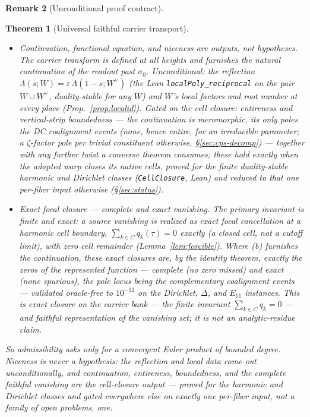 \documentclass[11pt]{article}
\newtheorem{theorem}{Theorem}
\theoremstyle{definition}
\newtheorem{remark}[theorem]{Remark}
\renewcommand{\Re}{\operatorname{Re}}
\begin{document}
\begin{remark}[Unconditional proof contract]
\begin{enumerate}
\begin{theorem}[Universal faithful carrier transport]
\begin{itemize}
$\{\Re s>\sigma_0\}$; the growth/magnitude clock carries the coefficients $a_n(W)$ whatever their size, so no
Ramanujan bound is needed.
\item[\textup{(b)}] \emph{Continuation, functional equation, and niceness are outputs, not hypotheses.} The
carrier transform is defined at all heights and furnishes the natural continuation of the readout past
$\sigma_0$. \emph{Unconditional}: the reflection $\Lambda(s;W)=\varepsilon\,\Lambda(1-s;W^\vee)$ (the Lean
\texttt{localPoly\_reciprocal} on the pair $W\sqcup W^\vee$, duality-stable for any $W$) and $W$'s local factors
and root number at every place (Prop.~\ref{prop:localid}). \emph{Gated on the cell closure}: entireness and
vertical-strip boundedness --- the continuation is meromorphic, its only poles the DC coalignment events (none,
hence entire, for an irreducible parameter; a $\zeta$-factor pole per trivial constituent otherwise,
\S\ref{sec:cps-decomp}) --- together with any further twist a converse theorem consumes; these hold exactly when
the adapted warp closes its native cells, \emph{proved} for the finite duality-stable harmonic and Dirichlet
classes (\texttt{CellClosure}, Lean) and reduced to that \emph{one} per-fiber input otherwise (\S\ref{sec:status}).
\item[\textup{(c)}] \emph{Exact focal closure --- complete and exact vanishing.} The primary invariant is finite
and exact: a source vanishing is realized as \emph{exact focal cancellation} at a harmonic cell boundary,
$\sum_{k\in C}q_k(\tau)=0$ \emph{exactly} (a closed cell, not a cutoff limit), with zero cell remainder
(Lemma~\ref{lem:forcible}). Where \emph{(b)} furnishes the continuation, these exact closures are, by the identity
theorem, exactly the zeros of the represented function --- \emph{complete} (no zero missed) and \emph{exact} (none
spurious), the pole locus being the complementary coalignment events --- validated oracle-free to $10^{-12}$ on
the Dirichlet, $\Delta$, and $E_{11}$ instances. This is exact closure on the carrier bank --- the finite invariant
$\sum_{k\in C}q_k=0$ --- and faithful representation of the vanishing \emph{set}; it is not an analytic-residue
claim.
\end{itemize}
So admissibility asks only for a convergent Euler product of bounded degree. Niceness is never a hypothesis: the
reflection and local data come out unconditionally, and continuation, entireness, boundedness, and the complete
faithful vanishing are the cell-closure output --- proved for the harmonic and Dirichlet classes and gated
everywhere else on exactly one per-fiber input, not a family of open problems, one.
\end{theorem}


\end{enumerate}
\end{remark}
\end{document}
